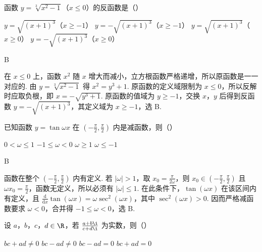 \begin{problem}
函数 \( y = \sqrt[3]{x^2 - 1} \)（\(x \leqslant 0\)）的反函数是（\quad）

\choices
    {\( y = \sqrt{(x + 1)^3} \)（\(x \geqslant -1\)）}
    {\( y = -\sqrt{(x + 1)^3} \)（\(x \geqslant -1\)）}
    {\( y = \sqrt{(x + 1)^3} \)（\(x \geqslant 0\)）}
    {\( y = -\sqrt{(x + 1)^3} \)（\(x \geqslant 0\)）}
\end{problem}

\begin{answer}
B
\end{answer}

\begin{solution}
在 \(x\leqslant0\) 上，函数 \(x^2\) 随 \(x\) 增大而减小，立方根函数严格递增，所以原函数是一一对应的. 由 \(y=\sqrt[3]{x^2-1}\) 得 \(x^2=y^3+1\). 原函数的定义域限制为 \(x\leqslant0\)，所以反解时应取负根，即 \(x=-\sqrt{y^3+1}\). 原函数的值域为 \(y\geqslant-1\)，交换 \(x\)，\(y\) 后得到反函数 \(y=-\sqrt{(x+1)^3}\)，其定义域为 \(x\geqslant-1\)，选 B.
\end{solution}

\begin{problem}
已知函数 \( y = \tan \omega x \) 在 \( \left(-\frac{\pi}{2}, \frac{\pi}{2}\right) \) 内是减函数，则（\quad）

\choices
    {\(0 < \omega \leqslant 1\)}
    {\(-1 \leqslant \omega < 0\)}
    {\(\omega \geqslant 1\)}
    {\(\omega \leqslant -1\)}
\end{problem}

\begin{answer}
B
\end{answer}

\begin{solution}
函数在整个 \(\left(-\frac{\pi}{2},\frac{\pi}{2}\right)\) 内有定义. 若 \(|\omega|>1\)，取 \(x_0=\frac{\pi}{2\omega}\)，则 \(x_0\in\left(-\frac{\pi}{2},\frac{\pi}{2}\right)\) 且 \(\omega x_0=\frac{\pi}{2}\)，函数无定义，所以必须有 \(|\omega|\leqslant1\). 在此条件下，\(\tan(\omega x)\) 在该区间内有定义，且 \(\frac{\mathrm{d}}{\mathrm{d}x}\tan(\omega x)=\omega\sec^2(\omega x)\)，其中 \(\sec^2(\omega x)>0\). 因而严格减函数要求 \(\omega<0\)，合并得 \(-1\leqslant\omega<0\)，选 B.
\end{solution}

\begin{problem}
设 \(a\)，\(b\)，\(c\)，\(d \in \R\)，若 \(\frac{a + b\i}{c + d\i}\) 为实数，则（\quad）

\choices
    {\(b c + a d \neq 0\)}
    {\(bc - ad \neq 0\)}
    {\(bc - ad = 0\)}
    {\(bc + ad = 0\)}
\end{problem}

